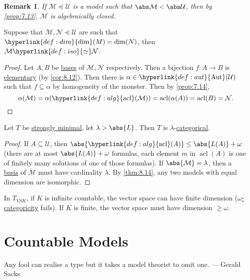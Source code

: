 \documentclass{article}
\DeclareMathOperator{\Aut}{Aut}
\DeclareMathOperator{\acl}{acl}
\newtheorem{nremark}[nthm]{Remark}
\newcommand{\M}{\mathcal{M}}
\renewcommand{\N}{\mathcal{N}}
\newcommand{\U}{\mathcal{U}}
\begin{document}
\begin{nremark}\label{rem:8.13}
If $\M \preccurlyeq \U$ is a model such that $\abs \M < \abs \U$, then by \cref{prop:7.13}, $\M$ is algebraically closed.
\end{nremark}

\begin{nthm}\label{thm:8.14}
  Suppose that $\M, \N \preccurlyeq \U$ are such that $\hyperlink{def:dim}{\dim}(M) = \dim(N)$, then $\M \hyperlink{def:iso}{\simeq} \N$.
\end{nthm}
\begin{proof}
  Let $A,B$ be \hyperlink{def:basis}{bases} of $\M,\N$ respectively.
  Then a bijection $f: A \to B$ is \hyperlink{def:upe}{elementary} (by \cref{cor:8.12}).
  Then there is $\alpha \in \hyperlink{def:aut}{\Aut}(\U)$ such that $f \subseteq \alpha$ by homogeneity of the monster. Then by \cref{prop:7.14},
  \begin{equation*}
    \alpha(\M) = \alpha(\hyperlink{def:alg}{\acl}(\M)) = \acl(\alpha(A)) = \acl(B) = \N. \qedhere
  \end{equation*}
\end{proof}
\begin{ncor}\label{cor:8.15}
  Let $T$ be \hyperlink{def:minimal}{strongly minimal}, let $\lambda > \abs{L}$. Then $T$ is $\lambda$-\hyperlink{def:wcat}{categorical}.
\end{ncor}
\begin{proof}
  If $A \subseteq \mathcal{U}$, then $\abs{\hyperlink{def:alg}{\acl}(A)} \leq \abs{L(A)} + \omega$ (there are at most $\abs{L(A)} + \omega$ formulas, each element $m$ in $\acl(A)$ is one of finitely many solutions of one of those formulas).
  If $\abs{\mathcal{M}} = \lambda$, then a \hyperlink{def:basis}{basis} of $\M$ must have cardinality $\lambda$.
  By \cref{thm:8.14}, any two models with equal dimension are isomorphic.
\end{proof}

In \hyperlink{def:vsk}{$T_{VSK}$}, if $K$ is infinite countable, the vector space can have finite dimension (\hyperlink{def:wcat}{$\omega$-categoricity} fails). If $K$ is finite, the vector space must have dimension $\geq \omega$.

\clearpage
\section{Countable Models}
\begin{displayquote}
Any fool can realise a type but it takes a model theorist to omit one. ---  Gerald Sacks
\end{displayquote}
\end{document}
